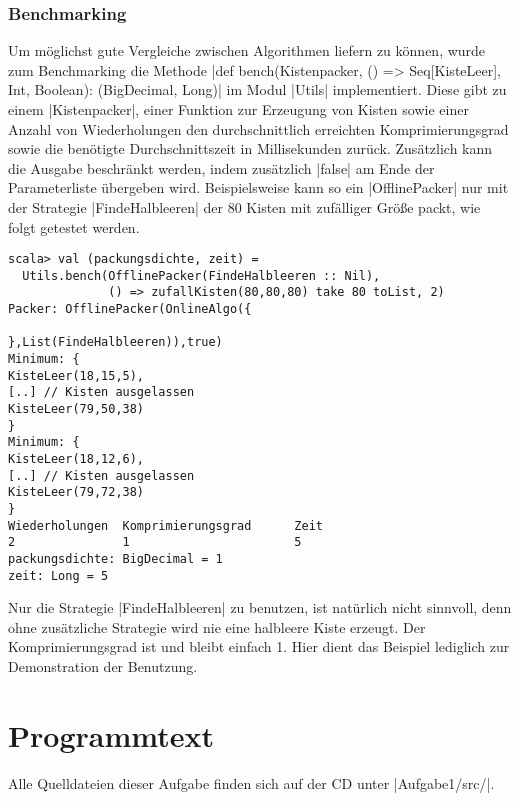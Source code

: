 \subsubsection{Benchmarking}
 Um möglichst gute Vergleiche zwischen Algorithmen liefern zu können,
  wurde zum Benchmarking die Methode |def bench(Kistenpacker, () => Seq[KisteLeer], Int, Boolean): (BigDecimal, Long)| im Modul |Utils| implementiert.
 Diese gibt zu einem |Kistenpacker|,
  einer Funktion zur Erzeugung von Kisten sowie einer Anzahl von Wiederholungen den durchschnittlich erreichten Komprimierungsgrad sowie die benötigte Durchschnittszeit in Millisekunden zurück.
 Zusätzlich kann die Ausgabe beschränkt werden, indem zusätzlich |false| am Ende der Parameterliste übergeben wird.
 Beispielsweise kann so ein |OfflinePacker| nur mit der Strategie |FindeHalbleeren| der 80 Kisten mit zufälliger Größe packt, wie folgt getestet werden.
\begin{lstlisting}
scala> val (packungsdichte, zeit) =
  Utils.bench(OfflinePacker(FindeHalbleeren :: Nil),
              () => zufallKisten(80,80,80) take 80 toList, 2) 
Packer: OfflinePacker(OnlineAlgo({

},List(FindeHalbleeren)),true)
Minimum: {
KisteLeer(18,15,5),
[..] // Kisten ausgelassen
KisteLeer(79,50,38)
}
Minimum: {
KisteLeer(18,12,6),
[..] // Kisten ausgelassen
KisteLeer(79,72,38)
}
Wiederholungen  Komprimierungsgrad      Zeit
2               1                       5
packungsdichte: BigDecimal = 1
zeit: Long = 5
\end{lstlisting}
 Nur die Strategie |FindeHalbleeren| zu benutzen, ist natürlich nicht sinnvoll,
  denn ohne zusätzliche Strategie wird nie eine halbleere Kiste erzeugt. Der Komprimierungsgrad ist und bleibt einfach 1.
 Hier dient das Beispiel lediglich zur Demonstration der Benutzung.

\addtolength{\textheight}{0cm}
\lstset{xleftmargin=-.8cm,xrightmargin=-.8cm}
\fontsize{8pt}{8.4pt}
\lstset{basicstyle=\ttfamily\small}
\clearpage
\section{Programmtext}
\label{code1}
Alle Quelldateien dieser Aufgabe finden sich auf der CD unter |Aufgabe1/src/|.
